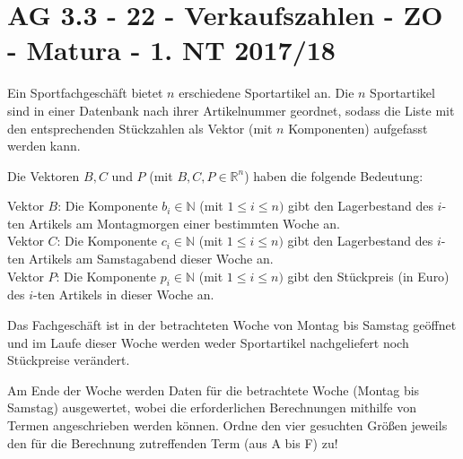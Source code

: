 \section{AG 3.3 - 22 - Verkaufszahlen - ZO - Matura - 1. NT 2017/18}

\begin{beispiel}[AG 3.3]{1}
Ein Sportfachgeschäft bietet $n$ erschiedene Sportartikel an. Die $n$ Sportartikel sind in einer Datenbank nach ihrer Artikelnummer geordnet, sodass die Liste mit den entsprechenden Stückzahlen als Vektor (mit $n$ Komponenten) aufgefasst werden kann.

Die Vektoren $B, C$ und $P$ (mit $B, C, P\in\mathbb{R}^n$) haben die folgende Bedeutung:

Vektor $B$: Die Komponente $b_i\in\mathbb{N}$ (mit $1\leq i\leq n)$ gibt den Lagerbestand des $i$-ten Artikels am Montagmorgen einer bestimmten Woche an.\\
Vektor $C$: Die Komponente $c_i\in\mathbb{N}$ (mit $1\leq i\leq n)$ gibt den Lagerbestand des $i$-ten Artikels am Samstagabend dieser Woche an.\\
Vektor $P$: Die Komponente $p_i\in\mathbb{N}$ (mit $1\leq i\leq n)$ gibt den Stückpreis (in Euro) des $i$-ten Artikels in dieser Woche an.

Das Fachgeschäft ist in der betrachteten Woche von Montag bis Samstag geöffnet und im Laufe dieser Woche werden weder Sportartikel nachgeliefert noch Stückpreise verändert.

Am Ende der Woche werden Daten für die betrachtete Woche (Montag bis Samstag) ausgewertet, wobei die erforderlichen Berechnungen mithilfe von Termen angeschrieben werden können. Ordne den vier gesuchten Größen jeweils den für die Berechnung zutreffenden Term (aus A bis F) zu!

\end{beispiel}